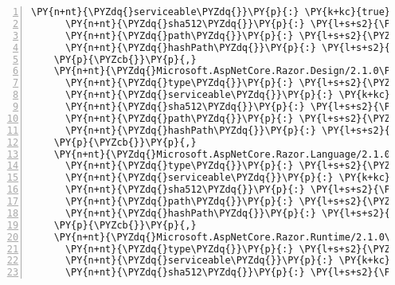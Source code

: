 \begin{Verbatim}[commandchars=\\\{\},numbers=left,firstnumber=1,stepnumber=1,numberblanklines=0]
      \PY{n+nt}{\PYZdq{}serviceable\PYZdq{}}\PY{p}{:} \PY{k+kc}{true}\PY{p}{,}
      \PY{n+nt}{\PYZdq{}sha512\PYZdq{}}\PY{p}{:} \PY{l+s+s2}{\PYZdq{}sha512\PYZhy{}V6C8V1sILz1ZBXPkEsgg1kTwb1TDVOZ0eig6nNH9mKFCt9DgiV0CKnAbmvMTtQYZvEHzHoZNPlY3+EcRe7xKBg==\PYZdq{}}\PY{p}{,}
      \PY{n+nt}{\PYZdq{}path\PYZdq{}}\PY{p}{:} \PY{l+s+s2}{\PYZdq{}microsoft.aspnetcore.razor/2.1.0\PYZhy{}rc1\PYZhy{}final\PYZdq{}}\PY{p}{,}
      \PY{n+nt}{\PYZdq{}hashPath\PYZdq{}}\PY{p}{:} \PY{l+s+s2}{\PYZdq{}microsoft.aspnetcore.razor.2.1.0\PYZhy{}rc1\PYZhy{}final.nupkg.sha512\PYZdq{}}
    \PY{p}{\PYZcb{}}\PY{p}{,}
    \PY{n+nt}{\PYZdq{}Microsoft.AspNetCore.Razor.Design/2.1.0\PYZhy{}rc1\PYZhy{}final\PYZdq{}}\PY{p}{:} \PY{p}{\PYZob{}}
      \PY{n+nt}{\PYZdq{}type\PYZdq{}}\PY{p}{:} \PY{l+s+s2}{\PYZdq{}package\PYZdq{}}\PY{p}{,}
      \PY{n+nt}{\PYZdq{}serviceable\PYZdq{}}\PY{p}{:} \PY{k+kc}{true}\PY{p}{,}
      \PY{n+nt}{\PYZdq{}sha512\PYZdq{}}\PY{p}{:} \PY{l+s+s2}{\PYZdq{}sha512\PYZhy{}jc4hGmHOZ/s4cGorB5XS8tpVL1wIVPyK3/O1sr93SAC7cJYWahQbK5zhrg/t0VM4o79kNpPB2raXbpBN1KZRFA==\PYZdq{}}\PY{p}{,}
      \PY{n+nt}{\PYZdq{}path\PYZdq{}}\PY{p}{:} \PY{l+s+s2}{\PYZdq{}microsoft.aspnetcore.razor.design/2.1.0\PYZhy{}rc1\PYZhy{}final\PYZdq{}}\PY{p}{,}
      \PY{n+nt}{\PYZdq{}hashPath\PYZdq{}}\PY{p}{:} \PY{l+s+s2}{\PYZdq{}microsoft.aspnetcore.razor.design.2.1.0\PYZhy{}rc1\PYZhy{}final.nupkg.sha512\PYZdq{}}
    \PY{p}{\PYZcb{}}\PY{p}{,}
    \PY{n+nt}{\PYZdq{}Microsoft.AspNetCore.Razor.Language/2.1.0\PYZhy{}rc1\PYZhy{}final\PYZdq{}}\PY{p}{:} \PY{p}{\PYZob{}}
      \PY{n+nt}{\PYZdq{}type\PYZdq{}}\PY{p}{:} \PY{l+s+s2}{\PYZdq{}package\PYZdq{}}\PY{p}{,}
      \PY{n+nt}{\PYZdq{}serviceable\PYZdq{}}\PY{p}{:} \PY{k+kc}{true}\PY{p}{,}
      \PY{n+nt}{\PYZdq{}sha512\PYZdq{}}\PY{p}{:} \PY{l+s+s2}{\PYZdq{}sha512\PYZhy{}Ap9SxmR5ndpqPx3RI31bEg1NMqFvIagbfwghVJB7/h0g52RgU2w4QJP0/uXmxi+AHd1Xoa6W8uRHfCfpjC82aA==\PYZdq{}}\PY{p}{,}
      \PY{n+nt}{\PYZdq{}path\PYZdq{}}\PY{p}{:} \PY{l+s+s2}{\PYZdq{}microsoft.aspnetcore.razor.language/2.1.0\PYZhy{}rc1\PYZhy{}final\PYZdq{}}\PY{p}{,}
      \PY{n+nt}{\PYZdq{}hashPath\PYZdq{}}\PY{p}{:} \PY{l+s+s2}{\PYZdq{}microsoft.aspnetcore.razor.language.2.1.0\PYZhy{}rc1\PYZhy{}final.nupkg.sha512\PYZdq{}}
    \PY{p}{\PYZcb{}}\PY{p}{,}
    \PY{n+nt}{\PYZdq{}Microsoft.AspNetCore.Razor.Runtime/2.1.0\PYZhy{}rc1\PYZhy{}final\PYZdq{}}\PY{p}{:} \PY{p}{\PYZob{}}
      \PY{n+nt}{\PYZdq{}type\PYZdq{}}\PY{p}{:} \PY{l+s+s2}{\PYZdq{}package\PYZdq{}}\PY{p}{,}
      \PY{n+nt}{\PYZdq{}serviceable\PYZdq{}}\PY{p}{:} \PY{k+kc}{true}\PY{p}{,}
      \PY{n+nt}{\PYZdq{}sha512\PYZdq{}}\PY{p}{:} \PY{l+s+s2}{\PYZdq{}sha512\PYZhy{}8soc2nngjhWd6/uB6DNk+HAVy/Z5jIDci4K7h9t8lu1Uw5/2yPkTEaGgGsvDt4hBU21xgrsdc+nqfvnqPmCCFg==\PYZdq{}}\PY{p}{,}

\end{Verbatim}

